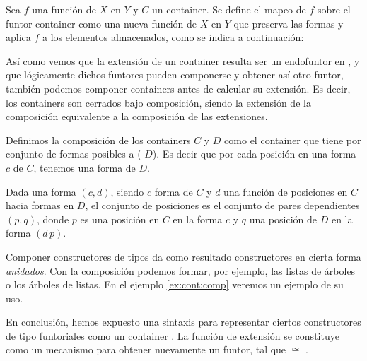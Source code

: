 \begin{definition} Sea $f$ una función de $X$ en $Y$ y $C$ un container. Se define el mapeo de $f$ sobre el funtor container  como una nueva función de  $X$ en  $Y$ que preserva las formas y aplica $f$ a los elementos almacenados, como se indica a continuación:

\end{definition}

Así como vemos que la extensión de un container resulta ser un endofuntor en , y que lógicamente dichos funtores pueden componerse y obtener así otro funtor, también podemos componer containers antes de calcular su extensión. Es decir, los containers son cerrados bajo composición, siendo la extensión de la composición equivalente a la composición de las extensiones.

\begin{definition} Definimos la composición de los containers $C$ y $D$ como el container que tiene por conjunto de formas posibles a  ( $D$). Es decir que por cada posición en una forma $c$ de $C$, tenemos una forma de $D$.

  Dada una forma $(c,d)$, siendo $c$ forma de $C$ y $d$ una función de posiciones en $C$ hacia formas en $D$, el conjunto de posiciones es el conjunto de pares dependientes $(p,q)$, donde $p$ es una posición en $C$ en la forma $c$ y $q$ una posición de $D$ en la forma $(d \, p)$.

\end{definition}

Componer constructores de tipos da como resultado constructores en cierta forma {\it anidados}. Con la composición podemos formar, por ejemplo, las listas de árboles o los árboles de listas. En el ejemplo \ref{ex:cont:comp} veremos un ejemplo de su uso.

\vspace{3ex}

En conclusión, hemos expuesto una sintaxis para representar ciertos constructores de tipo funtoriales  \AgdaSymbol{:}  \AgdaSymbol{$\to$}  como un container
 \AgdaSymbol{:} .
La función de extensión se constituye como un mecanismo para obtener nuevamente un funtor, tal que  $\cong$
.

